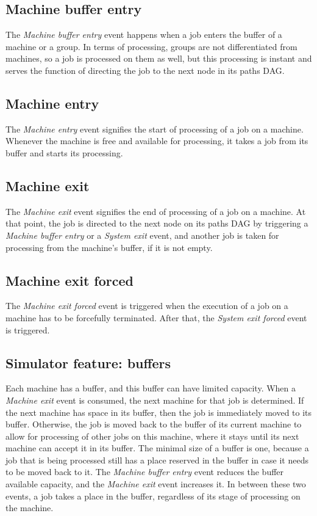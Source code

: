 \subsection{Machine buffer entry}
The \textit{Machine buffer entry} event happens when a job enters the buffer of a machine or a group. In terms of processing, groups are not differentiated from machines, so a job is processed on them as well, but this processing is instant and serves the function of directing the job to the next node in its paths DAG.

\subsection{Machine entry}
The \textit{Machine entry} event signifies the start of processing of a job on a machine. Whenever the machine is free and available for processing, it takes a job from its buffer and starts its processing.

\subsection{Machine exit}
The \textit{Machine exit} event signifies the end of processing of a job on a machine. At that point, the job is directed to the next node on its paths DAG by triggering a \textit{Machine buffer entry} or a \textit{System exit} event, and another job is taken for processing from the machine's buffer, if it is not empty.

\subsection{Machine exit forced}
The \textit{Machine exit forced} event is triggered when the execution of a job on a machine has to be forcefully terminated. After that, the \textit{System exit forced} event is triggered.

\subsection{Simulator feature: buffers}
Each machine has a buffer, and this buffer can have limited capacity. When a \textit{Machine exit} event is consumed, the next machine for that job is determined. If the next machine has space in its buffer, then the job is immediately moved to its buffer. Otherwise, the job is moved back to the buffer of its current machine to allow for processing of other jobs on this machine, where it stays until its next machine can accept it in its buffer. The minimal size of a buffer is one, because a job that is being processed still has a place reserved in the buffer in case it needs to be moved back to it. The \textit{Machine buffer entry} event reduces the buffer available capacity, and the \textit{Machine exit} event increases it. In between these two events, a job takes a place in the buffer, regardless of its stage of processing on the machine. 


